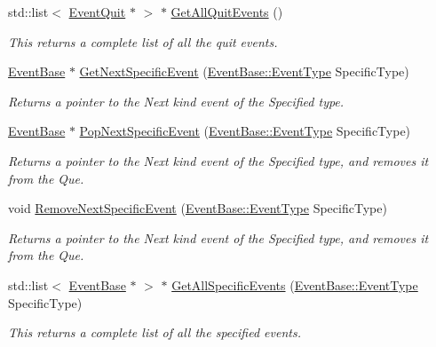 \begin{DoxyCompactItemize}
std::list$<$ \hyperlink{classphys_1_1EventQuit}{EventQuit} $\ast$ $>$ $\ast$ \hyperlink{classphys_1_1EventManager_afefd52a9693bc5541592997abbf3c53f}{GetAllQuitEvents} ()
\begin{DoxyCompactList}\small\item\em This returns a complete list of all the quit events. \item\end{DoxyCompactList}\item 
\hyperlink{classphys_1_1EventBase}{EventBase} $\ast$ \hyperlink{classphys_1_1EventManager_a7340cfab326856cf4ebc653b11101016}{GetNextSpecificEvent} (\hyperlink{classphys_1_1EventBase_a5e6a8564e127f654123f0bf6a2751923}{EventBase::EventType} SpecificType)
\begin{DoxyCompactList}\small\item\em Returns a pointer to the Next kind event of the Specified type. \item\end{DoxyCompactList}\item 
\hyperlink{classphys_1_1EventBase}{EventBase} $\ast$ \hyperlink{classphys_1_1EventManager_a156ba3c53cc799499272430111bbdfa4}{PopNextSpecificEvent} (\hyperlink{classphys_1_1EventBase_a5e6a8564e127f654123f0bf6a2751923}{EventBase::EventType} SpecificType)
\begin{DoxyCompactList}\small\item\em Returns a pointer to the Next kind event of the Specified type, and removes it from the Que. \item\end{DoxyCompactList}\item 
void \hyperlink{classphys_1_1EventManager_a486c1173a2c1a64885bfdbe7ca267611}{RemoveNextSpecificEvent} (\hyperlink{classphys_1_1EventBase_a5e6a8564e127f654123f0bf6a2751923}{EventBase::EventType} SpecificType)
\begin{DoxyCompactList}\small\item\em Returns a pointer to the Next kind event of the Specified type, and removes it from the Que. \item\end{DoxyCompactList}\item 
std::list$<$ \hyperlink{classphys_1_1EventBase}{EventBase} $\ast$ $>$ $\ast$ \hyperlink{classphys_1_1EventManager_a300e537d27cd53ac8276438d4c91a3f6}{GetAllSpecificEvents} (\hyperlink{classphys_1_1EventBase_a5e6a8564e127f654123f0bf6a2751923}{EventBase::EventType} SpecificType)
\begin{DoxyCompactList}\small\item\em This returns a complete list of all the specified events. \item\end{DoxyCompactList}\item 

\end{DoxyCompactItemize}
